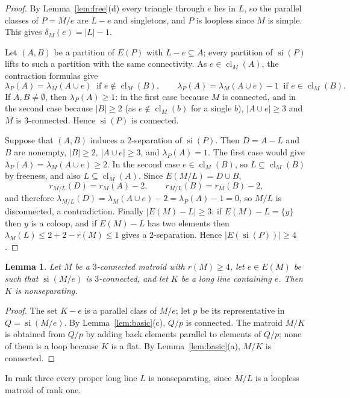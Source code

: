 \documentclass[11pt]{amsart}
\newtheorem{lemma}[theorem]{Lemma}
\theoremstyle{definition}
\theoremstyle{remark}
\numberwithin{equation}{section}
\newcommand{\cl}{\operatorname{cl}}
\newcommand{\si}{\operatorname{si}}
\newcommand{\lam}{\lambda}
\begin{document}
\begin{proof}
By Lemma~\ref{lem:free}(d) every triangle through $e$ lies in $L$, so the parallel classes of $P=M/e$ are $L-e$ and singletons, and $P$ is loopless since $M$ is simple. This gives $\delta_M(e)=|L|-1$.

Let $(A,B)$ be a partition of $E(P)$ with $L-e\subseteq A$; every partition of $\si(P)$ lifts to such a partition with the same connectivity. As $e\in\cl_M(A)$, the contraction formulas give
\[
\lam_P(A)=\lam_M(A\cup e)\ \text{ if } e\notin\cl_M(B),\qquad \lam_P(A)=\lam_M(A\cup e)-1\ \text{ if } e\in\cl_M(B).
\]
If $A,B\ne\emptyset$, then $\lam_P(A)\ge1$: in the first case because $M$ is connected, and in the second case because $|B|\ge2$ (as $e\notin\cl_M(b)$ for a single $b$), $|A\cup e|\ge3$ and $M$ is $3$-connected. Hence $\si(P)$ is connected.

Suppose that $(A,B)$ induces a $2$-separation of $\si(P)$. Then $D=A-L$ and $B$ are nonempty, $|B|\ge2$, $|A\cup e|\ge3$, and $\lam_P(A)=1$. The first case would give $\lam_P(A)=\lam_M(A\cup e)\ge2$. In the second case $e\in\cl_M(B)$, so $L\subseteq\cl_M(B)$ by freeness, and also $L\subseteq\cl_M(A)$. Since $E(M/L)=D\cup B$,
\[
r_{M/L}(D)=r_M(A)-2,\qquad r_{M/L}(B)=r_M(B)-2,
\]
and therefore $\lam_{M/L}(D)=\lam_M(A\cup e)-2=\lam_P(A)-1=0$,
so $M/L$ is disconnected, a contradiction. Finally $|E(M)-L|\ge3$: if $E(M)-L=\{y\}$ then $y$ is a coloop, and if $E(M)-L$ has two elements then $\lam_M(L)\le 2+2-r(M)\le1$ gives a $2$-separation. Hence $|E(\si(P))|\ge4$.
\end{proof}

\begin{lemma}\label{lem:contractornonsep}
Let $M$ be a $3$-connected matroid with $r(M)\ge4$, let $e\in E(M)$ be such that $\si(M/e)$ is $3$-connected, and let $K$ be a long line containing $e$. Then $K$ is nonseparating.
\end{lemma}

\begin{proof}
The set $K-e$ is a parallel class of $M/e$; let $p$ be its representative in $Q=\si(M/e)$. By Lemma~\ref{lem:basic}(c), $Q/p$ is connected. The matroid $M/K$ is obtained from $Q/p$ by adding back elements parallel to elements of $Q/p$; none of them is a loop because $K$ is a flat. By Lemma~\ref{lem:basic}(a), $M/K$ is connected.
\end{proof}

In rank three every proper long line $L$ is nonseparating, since $M/L$ is a loopless matroid of rank one.
\end{document}
